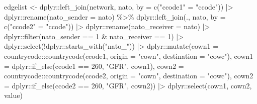 \documentclass[
  12,
  letterpaper,
  DIV=11,
  numbers=noendperiod]{scrartcl}
\newenvironment{Shaded}{\begin{snugshade}}{\end{snugshade}}
\newcommand{\AttributeTok}[1]{\textcolor[rgb]{0.40,0.45,0.13}{#1}}
\newcommand{\DecValTok}[1]{\textcolor[rgb]{0.68,0.00,0.00}{#1}}
\newcommand{\FunctionTok}[1]{\textcolor[rgb]{0.28,0.35,0.67}{#1}}
\newcommand{\NormalTok}[1]{\textcolor[rgb]{0.00,0.23,0.31}{#1}}
\newcommand{\OtherTok}[1]{\textcolor[rgb]{0.00,0.23,0.31}{#1}}
\newcommand{\SpecialCharTok}[1]{\textcolor[rgb]{0.37,0.37,0.37}{#1}}
\newcommand{\StringTok}[1]{\textcolor[rgb]{0.13,0.47,0.30}{#1}}
\begin{document}
\begin{Shaded}
\begin{Highlighting}[numbers=left,,]
\NormalTok{edgelist }\OtherTok{\textless{}{-}}\NormalTok{ dplyr}\SpecialCharTok{::}\FunctionTok{left\_join}\NormalTok{(network, nato, }\AttributeTok{by =} \FunctionTok{c}\NormalTok{(}\StringTok{"ccode1"} \OtherTok{=} \StringTok{"ccode"}\NormalTok{)) }\SpecialCharTok{|\textgreater{}}
\NormalTok{  dplyr}\SpecialCharTok{::}\FunctionTok{rename}\NormalTok{(}\AttributeTok{nato\_sender =}\NormalTok{ nato) }\SpecialCharTok{\%\textgreater{}\%}
\NormalTok{  dplyr}\SpecialCharTok{::}\FunctionTok{left\_join}\NormalTok{(., nato, }\AttributeTok{by =} \FunctionTok{c}\NormalTok{(}\StringTok{"ccode2"} \OtherTok{=} \StringTok{"ccode"}\NormalTok{)) }\SpecialCharTok{|\textgreater{}}
\NormalTok{  dplyr}\SpecialCharTok{::}\FunctionTok{rename}\NormalTok{(}\AttributeTok{nato\_receiver =}\NormalTok{ nato) }\SpecialCharTok{|\textgreater{}}
\NormalTok{  dplyr}\SpecialCharTok{::}\FunctionTok{filter}\NormalTok{(nato\_sender }\SpecialCharTok{==} \DecValTok{1} \SpecialCharTok{\&}\NormalTok{ nato\_receiver }\SpecialCharTok{==} \DecValTok{1}\NormalTok{) }\SpecialCharTok{|\textgreater{}}
\NormalTok{  dplyr}\SpecialCharTok{::}\FunctionTok{select}\NormalTok{(}\SpecialCharTok{!}\NormalTok{dplyr}\SpecialCharTok{::}\FunctionTok{starts\_with}\NormalTok{(}\StringTok{"nato\_"}\NormalTok{)) }\SpecialCharTok{|\textgreater{}}
\NormalTok{  dplyr}\SpecialCharTok{::}\FunctionTok{mutate}\NormalTok{(}\AttributeTok{cown1 =}\NormalTok{ countrycode}\SpecialCharTok{::}\FunctionTok{countrycode}\NormalTok{(ccode1, }\AttributeTok{origin =} \StringTok{"cown"}\NormalTok{, }\AttributeTok{destination =} \StringTok{"cowc"}\NormalTok{),}
                \AttributeTok{cown1 =}\NormalTok{ dplyr}\SpecialCharTok{::}\FunctionTok{if\_else}\NormalTok{(ccode1 }\SpecialCharTok{==} \DecValTok{260}\NormalTok{, }\StringTok{"GFR"}\NormalTok{, cown1),}
                \AttributeTok{cown2 =}\NormalTok{ countrycode}\SpecialCharTok{::}\FunctionTok{countrycode}\NormalTok{(ccode2, }\AttributeTok{origin =} \StringTok{"cown"}\NormalTok{, }\AttributeTok{destination =} \StringTok{"cowc"}\NormalTok{),}
                \AttributeTok{cown2 =}\NormalTok{ dplyr}\SpecialCharTok{::}\FunctionTok{if\_else}\NormalTok{(ccode2 }\SpecialCharTok{==} \DecValTok{260}\NormalTok{, }\StringTok{"GFR"}\NormalTok{, cown2)) }\SpecialCharTok{|\textgreater{}}
\NormalTok{  dplyr}\SpecialCharTok{::}\FunctionTok{select}\NormalTok{(cown1, cown2, value)}
\end{Highlighting}
\end{Shaded}
\end{document}
